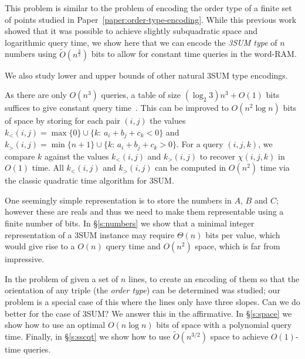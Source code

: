 This problem is similar to the problem of encoding the order
type of a finite set of points studied in Paper~\ref{paper:order-type-encoding}.
While this previous work showed that it was
possible to achieve slightly subquadratic space and logarithmic query time, we
show here that we can encode the \emph{3SUM type} of \(n\) numbers using
\(\tilde{O}(n^{\frac 32})\) bits to allow for constant time queries in the
word-RAM.

We also study lower and upper bounds of other natural 3SUM type encodings.

As there are only $O(n^3)$ queries, a table
of size $(\log_2 3) n^3 + O(1)$ bits suffices to give constant query time~\cite{DPT10}.
%
This can be improved to $O(n^2\log n)$ bits of space by
storing for each pair $(i,j)$ the values
\(k_<(i,j) = \max \{ 0\}\cup \{k \colon\, a_i + b_j + c_k < 0\}\) and
\(k_>(i,j) = \min \{ n+1\}\cup \{k \colon\, a_i + b_j + c_k > 0\}\).
For a query \((i,j,k)\), we compare \(k\) against the values \(k_<(i,j)\) and \(k_>(i,j)\)
to recover \(\chi(i,j,k)\) in \(O(1)\) time. All \(k_<(i,j)\) and \(k_>(i,j)\)
can be computed in \(O(n^2)\) time via the classic quadratic time algorithm for
3SUM.

One seemingly simple representation is to store the numbers in $A$, $B$ and
$C$; however these are reals and thus we need to make them representable using
a finite number of bits.
In \S\ref{s:numbers} we show that a minimal integer representation of a
3SUM instance may require $\Theta(n)$ bits per value, which would give
rise to a $O(n)$ query time and $O(n^2)$ space, which is far from
impressive.
%


In \cite{CCILO18} the problem of given a set of $n$ lines, to create an
encoding of them so that the orientation of any triple (the \emph{order type})
can be determined was studied; our problem is a special case of this where the
lines only have three slopes.
Can we do better for the case of 3SUM? We answer this in the affirmative.
In \S\ref{s:space} we show how to use an optimal $O(n \log n)$ bits of
space with a polynomial query time. Finally, in \S\ref{s:sscqt} we show
how to use $\tilde{O}(n^{3/2})$ space to achieve $O(1)$-time queries.



